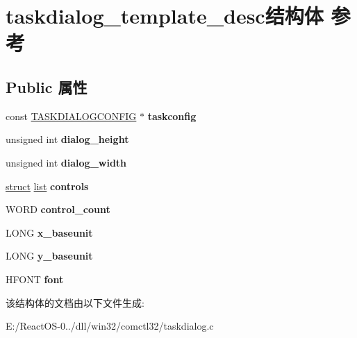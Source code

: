 \hypertarget{structtaskdialog__template__desc}{}\section{taskdialog\+\_\+template\+\_\+desc结构体 参考}
\label{structtaskdialog__template__desc}
\subsection*{Public 属性}
\begin{DoxyCompactItemize}
\item 
\mbox{\label{structtaskdialog__template__desc_a9e424fbd25451988b34b57bd749afa77}} 
const \hyperlink{struct___t_a_s_k_d_i_a_l_o_g_c_o_n_f_i_g}{T\+A\+S\+K\+D\+I\+A\+L\+O\+G\+C\+O\+N\+F\+IG} $\ast$ {\bfseries taskconfig}
\item 
\mbox{\label{structtaskdialog__template__desc_aefff39c757dd2fbb2a8fb9f067ddc3e4}} 
unsigned int {\bfseries dialog\+\_\+height}
\item 
\mbox{\label{structtaskdialog__template__desc_a758f4411479a4d3e46fe8a22660d92ff}} 
unsigned int {\bfseries dialog\+\_\+width}
\item 
\mbox{\label{structtaskdialog__template__desc_a9dff6427665091fbbfa8bf3d9bad85c4}} 
\hyperlink{interfacestruct}{struct} \hyperlink{classlist}{list} {\bfseries controls}
\item 
\mbox{\label{structtaskdialog__template__desc_a7fffc4a5f8555fb21c597dbe591f5307}} 
W\+O\+RD {\bfseries control\+\_\+count}
\item 
\mbox{\label{structtaskdialog__template__desc_a4264f1d0c087e78aae6df765e48ea2ed}} 
L\+O\+NG {\bfseries x\+\_\+baseunit}
\item 
\mbox{\label{structtaskdialog__template__desc_a9e2f9d7d40ae2b77bc5465268c76e23c}} 
L\+O\+NG {\bfseries y\+\_\+baseunit}
\item 
\mbox{\label{structtaskdialog__template__desc_a43fd627497075d75039c316fce425bc6}} 
H\+F\+O\+NT {\bfseries font}
\end{DoxyCompactItemize}


该结构体的文档由以下文件生成\+:\begin{DoxyCompactItemize}
\item 
E\+:/\+React\+O\+S-\/0../dll/win32/comctl32/taskdialog.\+c\end{DoxyCompactItemize}
